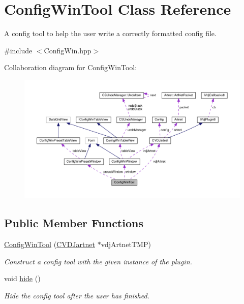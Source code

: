 \hypertarget{classConfigWinTool}{}\section{Config\+Win\+Tool Class Reference}
\label{classConfigWinTool}


A config tool to help the user write a correctly formatted config file.  




{\ttfamily \#include $<$Config\+Win.\+hpp$>$}



Collaboration diagram for Config\+Win\+Tool\+:
\nopagebreak
\begin{figure}[H]
\begin{center}
\leavevmode
\includegraphics[width=350pt]{classConfigWinTool__coll__graph}
\end{center}
\end{figure}
\subsection*{Public Member Functions}
\begin{DoxyCompactItemize}
\item 
\mbox{\label{classConfigWinTool_a4aea1c2bd45e724b3034446f5e71cd14}} 
\hyperlink{classConfigWinTool_a4aea1c2bd45e724b3034446f5e71cd14}{Config\+Win\+Tool} (\hyperlink{classCVDJartnet}{C\+V\+D\+Jartnet} $\ast$vdj\+Artnet\+T\+MP)
\begin{DoxyCompactList}\small\item\em Construct a config tool with the given instance of the plugin. \end{DoxyCompactList}\item 
\mbox{\label{classConfigWinTool_affa13cd91024a6d11997fa2577bf473e}} 
void \hyperlink{classConfigWinTool_affa13cd91024a6d11997fa2577bf473e}{hide} ()
\begin{DoxyCompactList}\small\item\em Hide the config tool after the user has finished. \end{DoxyCompactList}\end{DoxyCompactItemize}
